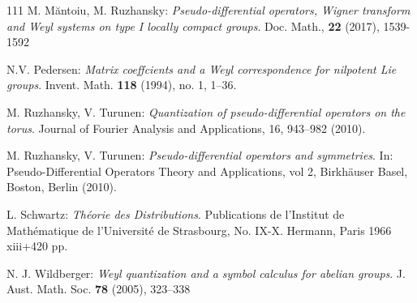 \documentclass[12pt]{article}
\theoremstyle{definition}
\numberwithin{equation}{section}
\begin{document}
\begin{thebibliography}{111}
 M. M\u{a}ntoiu, M. Ruzhansky: \textit{Pseudo-differential operators, Wigner transform
and Weyl systems on type I locally compact groups}.  Doc. Math., \textbf{22} (2017), 1539-1592

 N.V. Pedersen: \textit{Matrix coeffcients and a Weyl correspondence for nilpotent Lie groups}.
Invent. Math. \textbf{118} (1994), no. 1, 1–36.

 M. Ruzhansky, V. Turunen: \textit{Quantization of pseudo-differential operators on the torus}. Journal of Fourier Analysis and Applications, 16, 943--982 (2010).

 M. Ruzhansky, V. Turunen: \textit{Pseudo-differential operators and symmetries}. In: Pseudo-Differential Operators
Theory and Applications, vol 2, Birkh\"auser Basel, Boston, Berlin (2010).

 L. Schwartz: \textit{Th\'{e}orie des Distributions}. Publications de l'Institut de Math\'ematique de l'Universit\'e de Strasbourg, No. IX-X.  Hermann, Paris 1966 xiii+420 pp.

 N. J. Wildberger: \textit{Weyl quantization and a symbol calculus for abelian groups}. J. Aust. Math. Soc. \textbf{78} (2005), 323–338
\end{thebibliography}  
\end{document}
